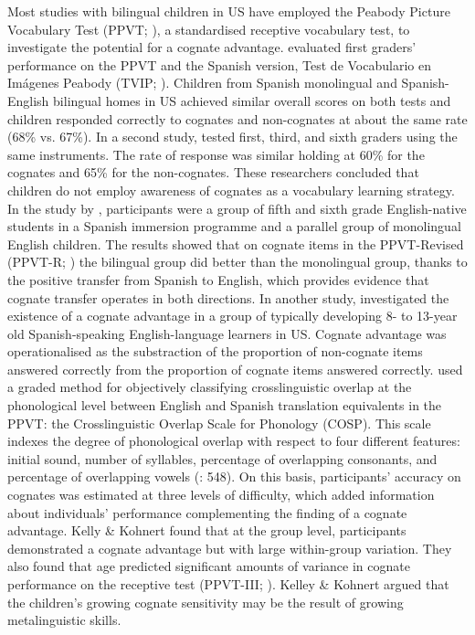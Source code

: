 \documentclass[output=paper,modfonts,nonflat,newtxmath]{langsci/langscibook}
\begin{document}
 {Most studies with bilingual children in US have employed the Peabody Picture Vocabulary Test (PPVT; \citealt{DunnDunn1981, DunnDunn1997}), a standardised receptive vocabulary test, to investigate the potential for a cognate advantage. \citet{UmbelEtAl1992} evaluated first graders’ performance on the PPVT and the Spanish version, Test de Vocabulario en Imágenes Peabody (TVIP; \citealt{DunnEtAl1986}). Children from Spanish monolingual and Spanish-English bilingual homes in US achieved similar overall scores on both tests and children responded correctly to cognates and non-cognates at about the same rate (68\% vs. 67\%). In a second study, \citet{UmbelOller1994} tested first, third, and sixth graders using the same instruments. The rate of response was similar holding at 60\% for the cognates and 65\% for the non-cognates. These researchers concluded that children do not employ awareness of cognates as a vocabulary learning strategy. In the study by \citet{CunninghamGraham2000}, participants were a group of fifth and sixth grade English-native students in a Spanish immersion programme and a parallel group of monolingual English children. The results showed that on cognate items in the PPVT-Revised (PPVT-R; \citealt{DunnDunn1981}) the bilingual group did better than the monolingual group, thanks to the positive transfer from Spanish to English, which provides evidence that cognate transfer operates in both directions. In another study, \citet{KelleyKohnert2012} investigated the existence of a cognate advantage in a group of typically developing 8- to 13-year old Spanish-speaking English-language learners in US. Cognate advantage was operationalised as the substraction of the proportion of non-cognate items answered correctly from the proportion of cognate items answered correctly. \citealt{KelleyKohnert2012} used a graded method for objectively classifying crosslinguistic overlap at the phonological level between English and Spanish translation equivalents in the PPVT: the Crosslinguistic Overlap Scale for Phonology (COSP). This scale indexes the degree of phonological overlap with respect to four different features: initial sound, number of syllables, percentage of overlapping consonants, and percentage of overlapping vowels (\citealt{KohnertEtAl2004}: 548). On this basis, participants’ accuracy on cognates was estimated at three levels of difficulty, which added information about individuals’ performance complementing the finding of a cognate advantage. Kelly \& Kohnert found that at the group level, participants demonstrated a cognate advantage but with large within-group variation. They also found that age predicted significant amounts of variance in cognate performance on the receptive test (PPVT-III; \citealt{DunnDunn1997}). Kelley \& Kohnert argued that the children’s growing cognate sensitivity may be the result of growing metalinguistic skills.}
\end{document}
